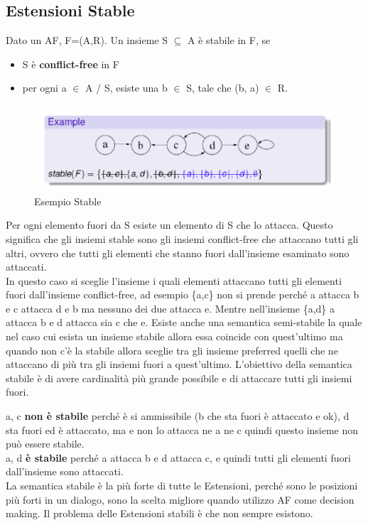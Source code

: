 \subsection{Estensioni Stable}
Dato un AF, F=(A,R). Un insieme S $\subseteq$ A è stabile in F, se
\begin{itemize}
    \item S è \textbf{conflict-free} in F
    \item per ogni a $\in$ A / S, esiste una b $\in$ S, tale che (b, a) $\in$ R.
\end{itemize}
\begin{figure}[htp]
    \centering
    \includegraphics[width=12cm, keepaspectratio]{capitoli/img/Cap6/stable.png}
    \caption{Esempio Stable}
\end{figure}
Per ogni elemento fuori da S esiste un elemento di S che lo attacca. Questo
significa che gli insiemi stable sono gli insiemi conflict-free che attaccano
tutti gli altri, ovvero che tutti gli elementi che stanno fuori dall'insieme
esaminato sono attaccati.\\
In questo caso si sceglie l'insieme i quali elementi attaccano tutti gli
elementi fuori dall'insieme conflict-free, ad esempio \{a,c\} non si prende
perché a attacca b e c attacca d e b ma nessuno dei due attacca e. Mentre
nell'insieme \{a,d\} a attacca b e d attacca sia c che e. Esiste anche una
semantica semi-stabile la quale nel caso cui esista un insieme stabile allora
essa coincide con quest'ultimo ma quando non c'è la stabile allora sceglie tra
gli insieme preferred quelli che ne attaccano di più tra gli insiemi fuori a
quest'ultimo. L'obiettivo della semantica stabile è di avere cardinalità più
grande possibile e di attaccare tutti gli insiemi fuori.

\vspace{0.5cm}

\noindent a, c \textbf{non è stabile} perché è si ammissibile (b che sta fuori è
attaccato e ok), d sta fuori ed è attaccato, ma e non lo attacca ne a ne c
quindi questo insieme non può essere stabile. \\a, d \textbf{è stabile} perché a
attacca b e d attacca c, e quindi tutti gli elementi fuori dall'insieme sono
attaccati. \\La semantica stabile è la più forte di tutte le Estensioni, perché
sono le posizioni più forti in un dialogo, sono la scelta migliore quando
utilizzo AF come decision making. Il problema delle Estensioni stabili è che non
sempre esistono.

